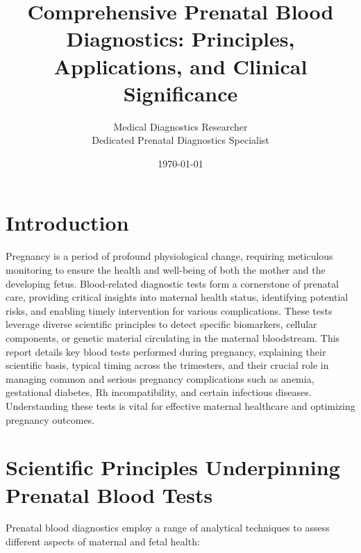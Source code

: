 \documentclass{article}
\title{Comprehensive Prenatal Blood Diagnostics: Principles, Applications, and Clinical Significance}
\author{Medical Diagnostics Researcher \\ \small Dedicated Prenatal Diagnostics Specialist}
\date{\today}
\begin{document}
\maketitle

\section{Introduction}
Pregnancy is a period of profound physiological change, requiring meticulous monitoring to ensure the health and well-being of both the mother and the developing fetus. Blood-related diagnostic tests form a cornerstone of prenatal care, providing critical insights into maternal health status, identifying potential risks, and enabling timely intervention for various complications. These tests leverage diverse scientific principles to detect specific biomarkers, cellular components, or genetic material circulating in the maternal bloodstream. This report details key blood tests performed during pregnancy, explaining their scientific basis, typical timing across the trimesters, and their crucial role in managing common and serious pregnancy complications such as anemia, gestational diabetes, Rh incompatibility, and certain infectious diseases. Understanding these tests is vital for effective maternal healthcare and optimizing pregnancy outcomes.

\section{Scientific Principles Underpinning Prenatal Blood Tests}
Prenatal blood diagnostics employ a range of analytical techniques to assess different aspects of maternal and fetal health:
\end{document}
